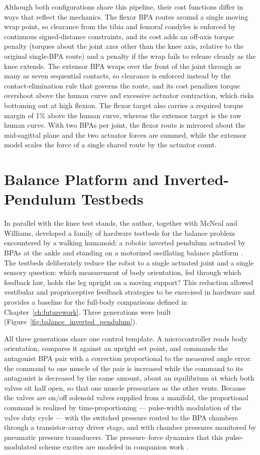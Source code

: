Although both configurations share this pipeline, their cost functions differ in ways that reflect the mechanics. The flexor BPA routes around a single moving wrap point, so clearance from the tibia and femoral condyles is enforced by continuous signed-distance constraints, and its cost adds an off-axis torque penalty (torques about the joint axes other than the knee axis, relative to the original single-BPA route) and a penalty if the wrap fails to release cleanly as the knee extends. The extensor BPA wraps over the front of the joint through as many as seven sequential contacts, so clearance is enforced instead by the contact-elimination rule that governs the route, and its cost penalizes torque overshoot above the human curve and excessive actuator contraction, which risks bottoming out at high flexion. The flexor target also carries a required torque margin of 1\% above the human curve, whereas the extensor target is the raw human curve. With two BPAs per joint, the flexor route is mirrored about the mid-sagittal plane and the two actuator forces are summed, while the extensor model scales the force of a single shared route by the actuator count.\par\section{Balance Platform and Inverted-Pendulum Testbeds}\label{sec:balance_testbeds}

In parallel with the knee test stands, the author, together with McNeal and Williams, developed a family of hardware testbeds for the balance problem encountered by a walking humanoid: a robotic inverted pendulum actuated by BPAs at the ankle and standing on a motorized oscillating balance platform \citep{bolen_balance_2024, bolen_selfbalancing_2024, bolen_selfbalancing_srs_2024}. The testbeds deliberately reduce the robot to a single actuated joint and a single sensory question: which measurement of body orientation, fed through which feedback law, holds the leg upright on a moving support? This reduction allowed vestibular and proprioceptive feedback strategies to be exercised in hardware and provides a baseline for the full-body comparisons defined in Chapter~\ref{ch:futurework}. Three generations were built (Figure~\ref{fig:balance_inverted_pendulum}).

All three generations share one control template. A microcontroller reads body orientation, compares it against an upright set point, and commands the antagonist BPA pair with a correction proportional to the measured angle error: the command to one muscle of the pair is increased while the command to its antagonist is decreased by the same amount, about an equilibrium at which both valves sit half open, so that one muscle pressurizes as the other vents. Because the valves are on/off solenoid valves supplied from a manifold, the proportional command is realized by time-proportioning --- pulse-width modulation of the valve duty cycle --- with the switched pressure routed to the BPA chambers through a transistor-array driver stage, and with chamber pressures monitored by pneumatic pressure transducers. The pressure--force dynamics that this pulse-modulated scheme excites are modeled in companion work \citep{elzein_pressure_2025}.

